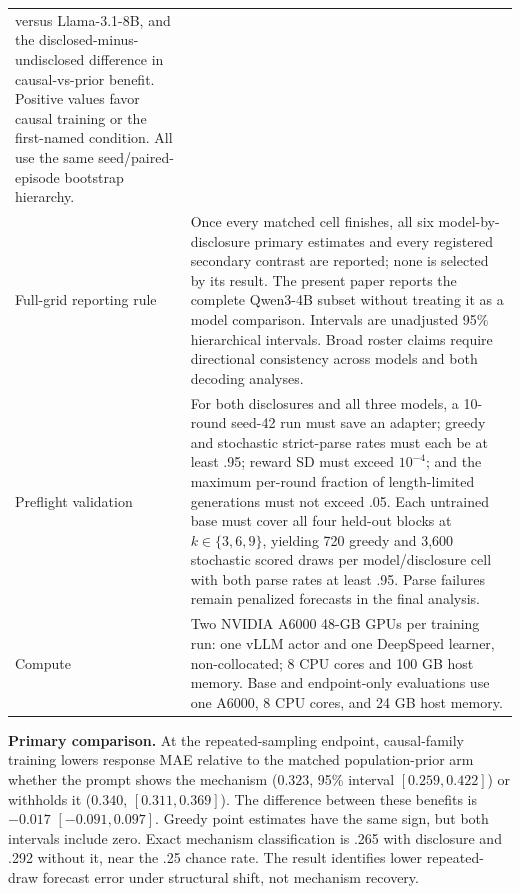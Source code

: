 \begin{center}
\begin{minipage}{\linewidth}
\begin{tabular}{p{.29\linewidth}p{.66\linewidth}}
versus Llama-3.1-8B, and the disclosed-minus-undisclosed difference in
causal-vs-prior benefit.  Positive values favor causal training or the first-named
condition. All use the same seed/paired-episode bootstrap hierarchy. \\
Full-grid reporting rule & Once every matched cell finishes, all six
model-by-disclosure primary estimates and every registered secondary contrast are
reported; none is selected by its result. The present paper reports the complete
Qwen3-4B subset without treating it as a model comparison. Intervals are unadjusted
95\% hierarchical intervals. Broad roster claims require directional consistency
across models and both decoding analyses. \\
Preflight validation & For both disclosures and all three models, a 10-round
seed-42 run must save an adapter; greedy and stochastic strict-parse rates must
each be at least .95; reward SD must exceed $10^{-4}$; and the maximum per-round
fraction of length-limited generations must not exceed .05. Each untrained base
must cover all four held-out blocks at $k\in\{3,6,9\}$, yielding 720 greedy and
3,600 stochastic scored draws per model/disclosure cell with both parse rates at
least .95. Parse failures remain penalized forecasts in the final analysis. \\
Compute & Two NVIDIA A6000 48-GB GPUs per training run: one vLLM actor and one
DeepSpeed learner, non-collocated; 8 CPU cores and 100 GB host memory.  Base and
endpoint-only evaluations use one A6000, 8 CPU cores, and 24 GB host memory. \\
\bottomrule
\end{tabular}
\end{minipage}
\end{center}
\begin{center}
\begin{minipage}{\linewidth}
\centering
{}
\label{tab:exp3c-completed-q4-overall}
\scriptsize
\setlength{\tabcolsep}{2pt}
\resizebox{\linewidth}{!}{%

}
\end{minipage}
\end{center}
\noindent\textbf{Primary comparison.}
At the repeated-sampling endpoint, causal-family training lowers response MAE
relative to the matched population-prior arm whether the prompt shows the
mechanism ($0.323$, 95\% interval $[0.259,0.422]$) or withholds it ($0.340$,
$[0.311,0.369]$). The difference between these benefits is $-0.017$
$[-0.091,0.097]$. Greedy point estimates have the same sign, but both intervals
include zero. Exact mechanism classification is .265 with disclosure and .292
without it, near the .25 chance rate. The result identifies lower repeated-draw
forecast error under structural shift, not mechanism recovery.


